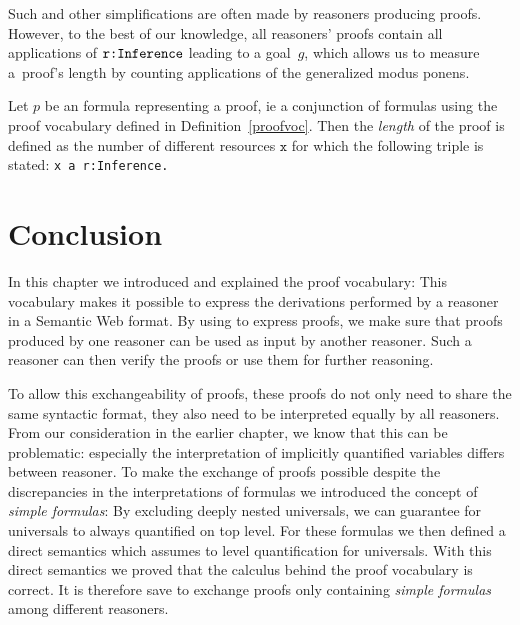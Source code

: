 Such and other simplifications are often made by \nthree reasoners producing proofs.
% 
% 
% 
However, to the best of our knowledge,
all reasoners' proofs contain all applications of $\verb!r:Inference!$ leading to a goal~$g$,
which allows us to measure a~proof's length by counting applications of the generalized modus ponens.

\begin{definition}
Let $p$ be an \nthree formula representing a proof, ie a conjunction of formulas using the proof vocabulary defined in Definition~\ref{proofvoc}. 
Then the \emph{length} of the proof is defined as the number of different resources $\texttt{x}$ for which the following triple is stated:
 \texttt{x a r:Inference.}
\end{definition}


\section{Conclusion}
In this chapter we introduced and explained the \nthree proof vocabulary: This vocabulary makes it possible to express the derivations performed by a reasoner in a Semantic Web format. 
By using \nthree to express proofs, we make sure that proofs produced by one reasoner can be used as input by another reasoner. Such a reasoner
can then verify the proofs or use them for further reasoning. 

To allow this exchangeability of proofs, these proofs do not only need to share the same syntactic format, they also need to be interpreted equally by all reasoners. 
From our consideration in the earlier chapter, we know that this can be problematic: especially the interpretation of implicitly quantified variables differs between reasoner.
To make the exchange of proofs possible despite the discrepancies in the interpretations of \nthree formulas we 
introduced the concept of \emph{simple formulas}: By excluding deeply nested universals,  we can guarantee for universals to  always quantified on top level. For these formulas 
we then defined a direct semantics which assumes to level quantification for universals. With this direct semantics we proved that the calculus behind the proof vocabulary is correct.
It is therefore save to exchange proofs only containing \emph{simple formulas} among different reasoners.

